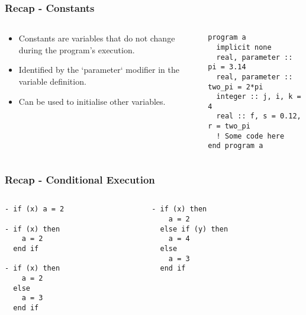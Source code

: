 \begin{frame}[fragile]
  \frametitle{Recap - Constants}
  \begin{columns}[T]
    \begin{column}{0.45\textwidth}
      \begin{itemize}
        \item Constants are variables that do not change during the program's execution.
        \item Identified by the `parameter` modifier in the variable definition.
        \item Can be used to initialise other variables.
      \end{itemize}
    \end{column}

    \begin{column}{0.55\textwidth}
      \begin{lstlisting}
program a
  implicit none
  real, parameter :: pi = 3.14
  real, parameter :: two_pi = 2*pi
  integer :: j, i, k = 4
  real :: f, s = 0.12, r = two_pi
  ! Some code here
end program a
      \end{lstlisting}
    \end{column}
  \end{columns}
\end{frame}


\begin{frame}[fragile]
  \frametitle{Recap - Conditional Execution}
  \begin{columns}[T]
    \begin{column}{0.5\textwidth}
      \begin{lstlisting}
- if (x) a = 2

- if (x) then
    a = 2
  end if

- if (x) then
    a = 2
  else
    a = 3
  end if
      \end{lstlisting}
    \end{column}

    \begin{column}{0.5\textwidth}
      \begin{lstlisting}
- if (x) then
    a = 2
  else if (y) then
    a = 4
  else
    a = 3
  end if
      \end{lstlisting}
    \end{column}
  \end{columns}
\end{frame}


